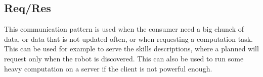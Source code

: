 \documentclass[conference]{IEEEtran}
\begin{document}
\subsection{Req/Res}

This communication pattern is used when the consumer need a big chunck of data, or data that is not updated often, or when requesting a computation task.
This can be used for example to serve the skills descriptions, where a planned will request only when the robot is discovered.
This can also be used to run some heavy computation on a server if the client is not powerful enough.

\end{document}
